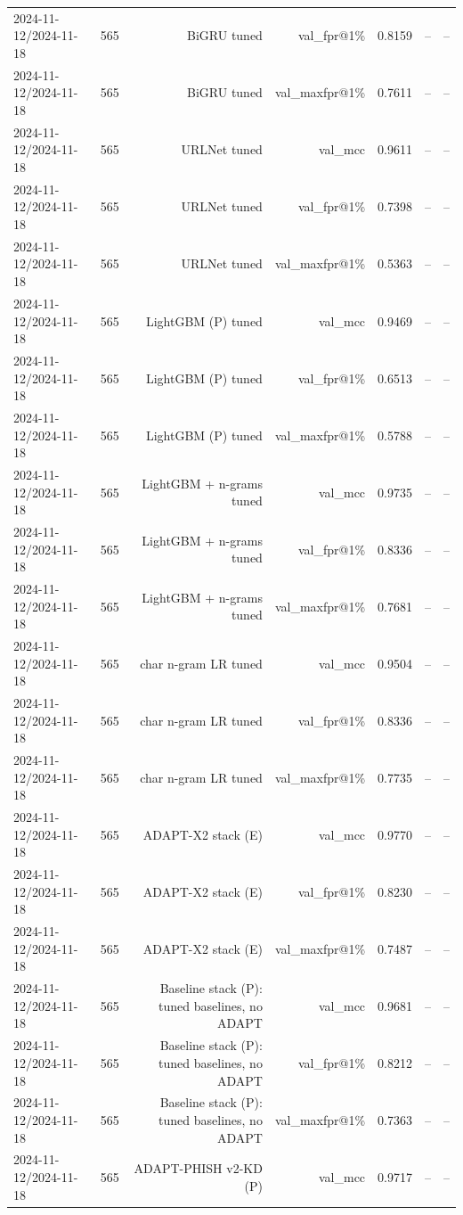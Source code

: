 \begin{table}[t]
\begin{tabular}{llrrrrr}
2024-11-12/2024-11-18 & 565 & BiGRU tuned & val\_fpr@1\% & 0.8159 & -- & -- \\
2024-11-12/2024-11-18 & 565 & BiGRU tuned & val\_maxfpr@1\% & 0.7611 & -- & -- \\
2024-11-12/2024-11-18 & 565 & URLNet tuned & val\_mcc & 0.9611 & -- & -- \\
2024-11-12/2024-11-18 & 565 & URLNet tuned & val\_fpr@1\% & 0.7398 & -- & -- \\
2024-11-12/2024-11-18 & 565 & URLNet tuned & val\_maxfpr@1\% & 0.5363 & -- & -- \\
2024-11-12/2024-11-18 & 565 & LightGBM (P) tuned & val\_mcc & 0.9469 & -- & -- \\
2024-11-12/2024-11-18 & 565 & LightGBM (P) tuned & val\_fpr@1\% & 0.6513 & -- & -- \\
2024-11-12/2024-11-18 & 565 & LightGBM (P) tuned & val\_maxfpr@1\% & 0.5788 & -- & -- \\
2024-11-12/2024-11-18 & 565 & LightGBM + n-grams tuned & val\_mcc & 0.9735 & -- & -- \\
2024-11-12/2024-11-18 & 565 & LightGBM + n-grams tuned & val\_fpr@1\% & 0.8336 & -- & -- \\
2024-11-12/2024-11-18 & 565 & LightGBM + n-grams tuned & val\_maxfpr@1\% & 0.7681 & -- & -- \\
2024-11-12/2024-11-18 & 565 & char n-gram LR tuned & val\_mcc & 0.9504 & -- & -- \\
2024-11-12/2024-11-18 & 565 & char n-gram LR tuned & val\_fpr@1\% & 0.8336 & -- & -- \\
2024-11-12/2024-11-18 & 565 & char n-gram LR tuned & val\_maxfpr@1\% & 0.7735 & -- & -- \\
2024-11-12/2024-11-18 & 565 & ADAPT-X2 stack (E) & val\_mcc & 0.9770 & -- & -- \\
2024-11-12/2024-11-18 & 565 & ADAPT-X2 stack (E) & val\_fpr@1\% & 0.8230 & -- & -- \\
2024-11-12/2024-11-18 & 565 & ADAPT-X2 stack (E) & val\_maxfpr@1\% & 0.7487 & -- & -- \\
2024-11-12/2024-11-18 & 565 & Baseline stack (P): tuned baselines, no ADAPT & val\_mcc & 0.9681 & -- & -- \\
2024-11-12/2024-11-18 & 565 & Baseline stack (P): tuned baselines, no ADAPT & val\_fpr@1\% & 0.8212 & -- & -- \\
2024-11-12/2024-11-18 & 565 & Baseline stack (P): tuned baselines, no ADAPT & val\_maxfpr@1\% & 0.7363 & -- & -- \\
2024-11-12/2024-11-18 & 565 & ADAPT-PHISH v2-KD (P) & val\_mcc & 0.9717 & -- & -- \\

\end{tabular}
\end{table}
